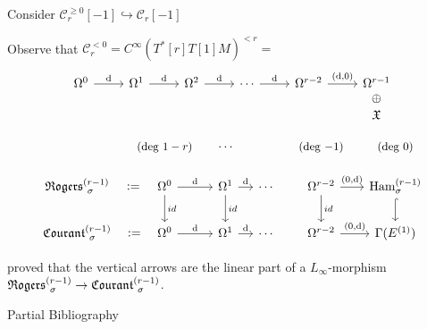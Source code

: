 \documentclass[beamer,10pt]{standalone}
\begin{document}
\begin{frame}
	Consider $\mathcal{C}_r^{\geq 0}[-1] \hookrightarrow \mathcal{C}_r[-1]$
	\vfill

	Observe that $\mathcal{C}_r^{<0} = C^\infty(T^*[r]T[1]M)^{<r}=$
	\begin{displaymath}
		\begin{tikzcd}[ampersand replacement=\&]
			\Omega^0 \ar[r,"\d"]\&
			\Omega^1 \ar[r,"\d"]\&
			\Omega^2 \ar[r,"\d"]\&
			\cdots \ar[r,"\d"]\&
			\Omega^{r-2} \ar[r,"{(\d,0)}"]\&
			\Omega^{r-1}\ar[d,phantom,"\oplus"]\\[-.7em]
			\&\&\&\&\&\X
 		\end{tikzcd}
	\end{displaymath}
	\vfill

	\begin{displaymath}
		\begin{tikzcd}[ampersand replacement=\&,column sep = small]
			\& \text{\small (deg $1-r$)} \& \cdots \& \&\text{\small (deg $-1$)} \& \text{\small (deg $0$)} \\[-.5em]
			\Rogers[\sigma]{r-1}   \ar[r,phantom,":="]
			\&
			\Omega^0 \ar[r,"{\d}"] \ar[d,"id"]
			\&
			\Omega^1 \ar[r,"{\d}"] \ar[d,"id"]
			\&
			\cdots
			\&
			\Omega^{r-2} \ar[r,"{(0,\d)}"] \ar[d,"id"]
			\& \Ham_{\sigma}^{(r-1)} \ar[d,hook]
			\\
			\Courant[\sigma]{r-1} \ar[r,phantom,":="]
			\&
			\Omega^0 \ar[r,"{\d}"]
			\&
			\Omega^1 \ar[r,"{\d}"] 
			\&
			\cdots
			\&
			\Omega^{r-2} \ar[r,"{(0,\d)}"]
			\& \Gamma(E^{(1)})
		\end{tikzcd}
	\end{displaymath}
	\vfill

	\cite{Miti2021} proved that the vertical arrows are the linear part of a $L_\infty$-morphism $\Rogers[\sigma]{r-1} \to \Courant[\sigma]{r-1}$.
\end{frame}




\ifstandalone
\begin{frame}[t,allowframebreaks]{Partial Bibliography}
	\nocite{Miti2021}
	
	
\end{frame}
\fi
\end{document}
